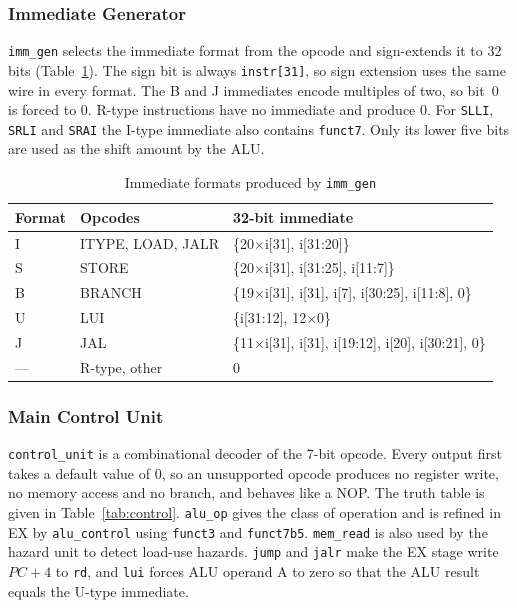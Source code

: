\subsubsection{Immediate Generator}
\texttt{imm\_gen} selects the immediate format from the opcode and
sign-extends it to 32 bits (Table~\ref{tab:imm_formats}). The sign bit is always
\texttt{instr[31]}, so sign extension uses the same wire in every format. The B
and J immediates encode multiples of two, so bit~0 is forced to 0. R-type
instructions have no immediate and produce 0. For \texttt{SLLI}, \texttt{SRLI}
and \texttt{SRAI} the I-type immediate also contains \texttt{funct7}. Only its
lower five bits are used as the shift amount by the ALU.

\begin{table}[!t]
\centering
\caption{Immediate formats produced by \texttt{imm\_gen}}
\label{tab:imm_formats}
\footnotesize
\begin{tabular}{|l|l|l|}
\hline
\textbf{Format} & \textbf{Opcodes} & \textbf{32-bit immediate} \\
\hline
I & ITYPE, LOAD, JALR & \{20$\times$i[31], i[31:20]\} \\
S & STORE & \{20$\times$i[31], i[31:25], i[11:7]\} \\
B & BRANCH & \{19$\times$i[31], i[31], i[7], i[30:25], i[11:8], 0\} \\
U & LUI & \{i[31:12], 12$\times$0\} \\
J & JAL & \{11$\times$i[31], i[31], i[19:12], i[20], i[30:21], 0\} \\
--- & R-type, other & 0 \\
\hline
\end{tabular}
\end{table}

\subsubsection{Main Control Unit}
\texttt{control\_unit} is a combinational decoder of the 7-bit opcode. Every
output first takes a default value of 0, so an unsupported opcode produces no
register write, no memory access and no branch, and behaves like a NOP. The
truth table is given in Table~\ref{tab:control}. \texttt{alu\_op} gives the
class of operation and is refined in EX by \texttt{alu\_control} using
\texttt{funct3} and \texttt{funct7b5}. \texttt{mem\_read} is also used by the
hazard unit to detect load-use hazards. \texttt{jump} and \texttt{jalr} make
the EX stage write $PC+4$ to \texttt{rd}, and \texttt{lui} forces ALU operand
A to zero so that the ALU result equals the U-type immediate.

